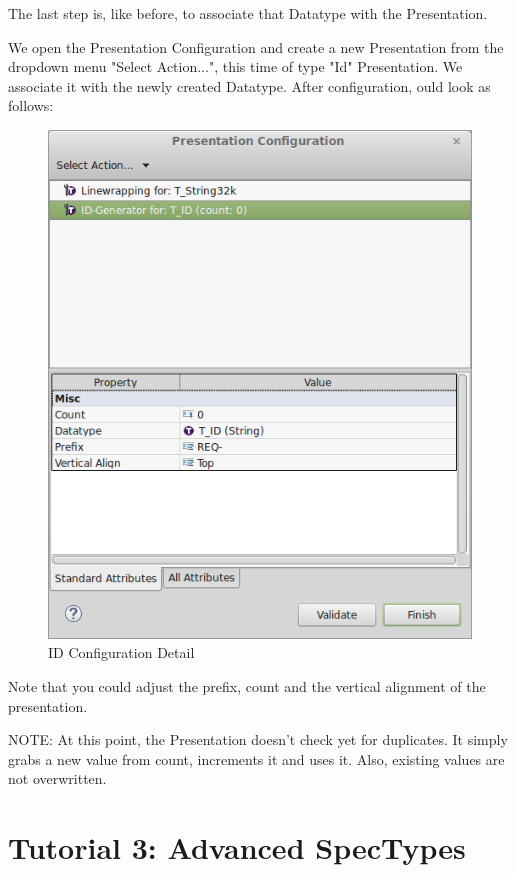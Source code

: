 The last step is, like before, to associate that Datatype with the Presentation.

We open the Presentation Configuration and create a new Presentation from the dropdown menu "Select Action...", this time of type "Id" Presentation.  We associate it with the newly created Datatype.  After configuration, ould look as follows:

\begin{figure}[h!]
\centering      
\includegraphics[width=0.8\linewidth]{../rmf-images/presentation_id.png}      
\caption{ID Configuration Detail}      
\label{fig:idConfig}
\end{figure}

Note that you could adjust the prefix, count and the vertical alignment of the presentation.

NOTE: At this point, the Presentation doesn't check yet for duplicates.  It simply grabs a new value from count, increments it and uses it.  Also, existing values are not overwritten.

\section{Tutorial 3: Advanced SpecTypes}

